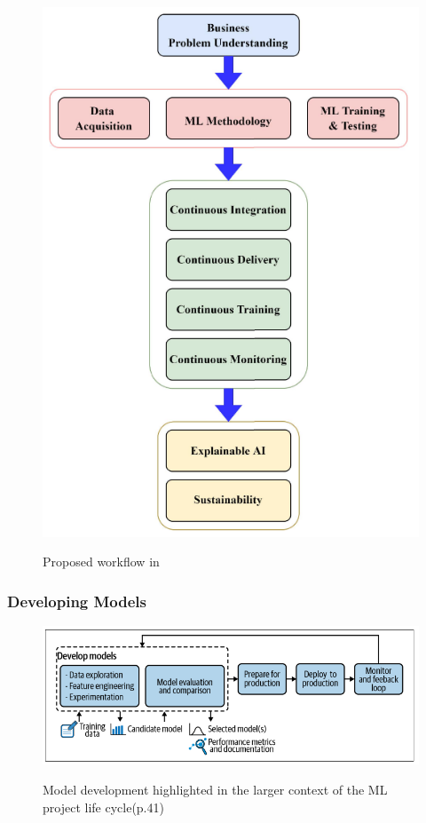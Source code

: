 \begin{figure}[!htbp]
    \caption{Proposed workflow in\cite{9792270}}
    \centering
    \includegraphics[scale=0.5]{images/taxo-workflow}
    \label{fig:taxo-workflow}
\end{figure}


\subsubsection{Developing Models}

\begin{figure}[!htbp]
    \caption{Model development highlighted in the larger context of the ML project life
    cycle\cite{treveil2020introducing}(p.41)}
    \centering
    \includegraphics[scale=0.5]{images/developing-models-intro}
    \label{fig:developing-models-intro}
\end{figure}


